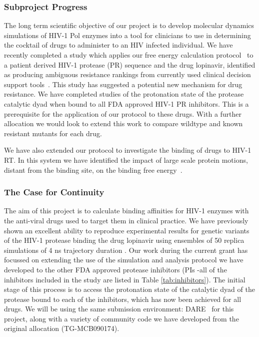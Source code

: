 \documentclass[a4paper,11pt]{article}
\begin{document}
\subsubsection{Subproject Progress}
The long term scientific objective of our project is to develop molecular dynamics simulations of HIV-1 Pol enzymes into a tool for clinicians to use in determining the cocktail of drugs to administer to an HIV infected individual. We have recently completed a study which applies our free energy calculation protocol~\cite{Ref2} to a patient derived HIV-1 protease (PR) sequence and the drug lopinavir, identified as producing ambiguous resistance rankings from currently used clinical decision support tools~\cite{Ref3}. This study has suggested a potential new mechanism for drug resistance. We have completed studies of the protonation state of the protease catalytic dyad when bound to all FDA approved HIV-1 PR inhibitors. This is a prerequisite for the application of our protocol to these drugs. With a further allocation we would look to extend this work to compare wildtype and known resistant mutants for each drug.

We have also extended our protocol to investigate the binding of drugs to HIV-1 RT. In this system we have identified the impact of large scale protein motions, distant from the binding site, on the binding free energy~\cite{Ref4}.


\subsubsection{The Case for Continuity}

The aim of this project is to calculate binding affinities for HIV-1 enzymes with the anti-viral 
drugs used to target them in clinical practice. We have previously shown an excellent ability to
reproduce experimental results for genetic variants of the HIV-1 protease binding the drug 
lopinavir using ensembles of 50 replica simulations of 4 ns trajectory duration \cite{Sadiq2010}. 
Our work during the current grant has focussed on extending the use of the simulation and analysis 
protocol we have developed to the other FDA approved protease inhibitors (PIs -all of the inhibitors 
included in the study are listed in Table \ref{tab:inhibitors}). 
The initial stage of this process is to access the protonation state of the catalytic dyad of the 
protease bound to each of the inhibitors, which has now been achieved for all drugs. We will be
using the same submission environment: DARE~\cite{dare-tg11} for this project, along with a variety
of community code we have developed from the original allocation (TG-MCB090174).
\end{document}
